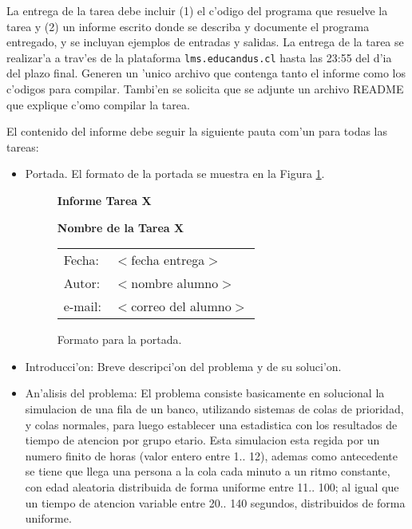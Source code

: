 \label{•} \documentclass[11pt]{utalcaDoc}
\begin{document}
La entrega de la tarea debe incluir (1) el c'odigo del programa que resuelve
la tarea y (2) un informe escrito donde se describa y documente el programa
entregado, y se incluyan ejemplos de entradas y salidas. La entrega de la tarea
se realizar'a a trav'es de la plataforma {\tt lms.educandus.cl} hasta las 23:55 del d'ia
del plazo final. Generen un 'unico archivo que contenga tanto el informe como
los c'odigos para compilar. Tambi'en se solicita que se adjunte un archivo
README que explique c'omo compilar la tarea.
     
El contenido del informe debe seguir la siguiente pauta com'un para todas las tareas: 

\begin{itemize}
\item
Portada. El formato de la portada se muestra en la Figura \ref{fig1}.

\begin{figure}[tbp]
%
%
%

\vspace{1cm}

\centerline{\huge \bf Informe Tarea X}
\vspace{0.8cm}
\centerline{\Large \bf Nombre de la Tarea X}

\vspace{2cm}

\hfill \begin{tabular}{ll}
Fecha:  & $<$fecha entrega$>$\\
Autor:  & $<$nombre alumno$>$\\
e-mail: & $<$correo del alumno$>$
\end{tabular}
\caption{Formato para la portada.}
\label{fig1}
\end{figure}

\item Introducci'on: Breve descripci'on del problema y de su soluci'on.

\item An'alisis del problema: El problema consiste basicamente en solucional la simulacion de una fila de un banco, utilizando sistemas de colas de prioridad, y colas normales, para luego establecer una estadistica con los resultados de tiempo de atencion por grupo etario. Esta simulacion esta regida por un numero finito de horas (valor entero entre 1.. 12), ademas como antecedente se tiene que llega una persona a la cola cada minuto a un ritmo constante, con edad aleatoria distribuida de forma uniforme entre 11.. 100; al igual que un tiempo de atencion variable entre 20.. 140 segundos, distribuidos de forma uniforme.\\


\end{itemize}
\end{document}
